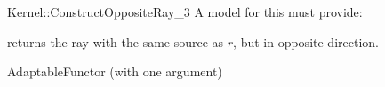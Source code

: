 \begin{ccRefFunctionObjectConcept}{Kernel::ConstructOppositeRay_3}
A model for this must provide:


{returns the ray with the same source as $r$, but in opposite direction.}

\ccRefines
AdaptableFunctor (with one argument)

\ccSeeAlso
{} \\

\end{ccRefFunctionObjectConcept}
